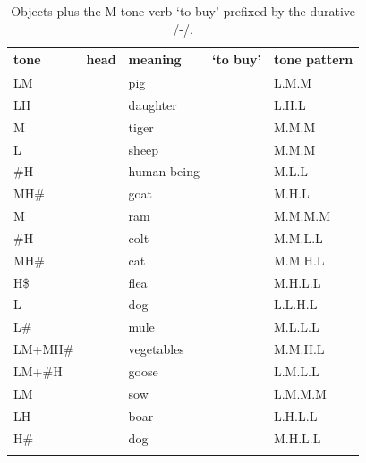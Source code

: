 {%
\begin{table}[t]
\caption{\label{tab:objectsplusmtoneverbsprefixedbythedurative}Objects plus the M-tone verb  ‘to buy’ prefixed by the {durative} /-/.}
\begin{tabularx}{\textwidth}{ l l l Q l }
\lsptoprule
	tone & head & meaning &  ‘to buy’ & tone pattern\\ \midrule
	LM &  & pig &  & L.M.M\\
	LH &  & daughter &  & L.H.L\\
	M &  & tiger &  & M.M.M\\
	L &  & sheep & \shadedcell {} & \shadedcell M.M.M\\
	\#H &  & human being &  & M.L.L\\
	MH\# &  & goat &  & M.H.L\\ \addlinespace \hdashline \addlinespace
	M &  & ram &  & M.M.M.M\\
	\#H &  & colt &  & M.M.L.L\\
	MH\# &  & cat &  & M.M.H.L\\
	H\$ &  & flea &  & M.H.L.L\\
	L &  & dog &  & L.L.H.L\\
	L\# &  & mule &  & M.L.L.L\\
	LM+MH\# &  & vegetables &  & M.M.H.L\\
	LM+\#H &  & goose &  & L.M.L.L\\
	LM &  & sow &  & L.M.M.M\\
	LH &  & boar &  & L.H.L.L\\
	H\# &  & dog &  & M.H.L.L\\
\lspbottomrule
\end{tabularx}
\end{table}}


